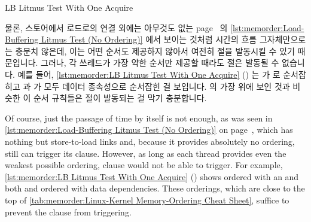 \begin{listing}[tbp]

\caption{LB Litmus Test With One Acquire}
\label{lst:memorder:LB Litmus Test With One Acquire}
\end{listing}

물론, 스토어에서 로드로의 연결 외에는 아무것도 없는
page~\pageref{lst:memorder:Load-Buffering Litmus Test (No Ordering)} 의
\cref{lst:memorder:Load-Buffering Litmus Test (No Ordering)}
에서 보이는 것처럼 시간의 흐름 그자체만으로는 충분치 않은데, 이는 어떤 순서도
제공하지 않아서 여전히  절을 발동시킬 수 있기 때문입니다.
그러나, 각 쓰레드가 가장 약한 순서만 제공할 때라도  절은 발동될 수
없습니다.
예를 들어,
\cref{lst:memorder:LB Litmus Test With One Acquire}
()
는  가  로 순서잡히고  과  가
모두 데이터 종속성으로 순서잡힌 걸 보입니다.
 의 가장 위에 보인
것과 비슷한 이 순서 규칙들은  절이 발동되는 걸 막기 충분합니다.

\iffalse

Of course, just the passage of time by itself is not enough, as
was seen in
\cref{lst:memorder:Load-Buffering Litmus Test (No Ordering)}
on
page~\pageref{lst:memorder:Load-Buffering Litmus Test (No Ordering)},
which has nothing but store-to-load links and, because it provides
absolutely no ordering, still can trigger its  clause.
However, as long as each thread provides even the weakest possible
ordering,  clause would not be able to trigger.
For example,
\cref{lst:memorder:LB Litmus Test With One Acquire}
()
shows  ordered with an  and
both  and  ordered with data dependencies.
These orderings, which are close to the top of
\cref{tab:memorder:Linux-Kernel Memory-Ordering Cheat Sheet},
suffice to prevent the  clause from triggering.

